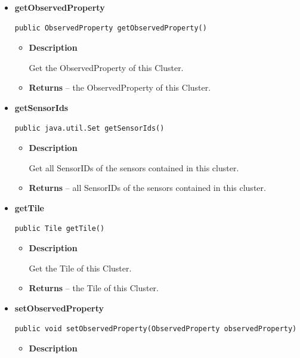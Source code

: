 {{{{\begin{itemize}
{\begin{itemize}
{Get the ClusterID of this Cluster.
}
\item{{\bf  Returns} -- 
the ClusterID of this Cluster. 
}%
\end{itemize}
}%
\item{ 
\hypertarget{Grid.Cluster.getObservedProperty()}{{\bf  getObservedProperty}\\}
\begin{lstlisting}[frame=none]
public ObservedProperty getObservedProperty()\end{lstlisting} %
\begin{itemize}
\item{
{\bf  Description}

Get the ObservedProperty of this Cluster.
}
\item{{\bf  Returns} -- 
the ObservedProperty of this Cluster. 
}%
\end{itemize}
}%
\item{ 
\hypertarget{Grid.Cluster.getSensorIds()}{{\bf  getSensorIds}\\}
\begin{lstlisting}[frame=none]
public java.util.Set getSensorIds()\end{lstlisting} %
\begin{itemize}
\item{
{\bf  Description}

Get all SensorIDs of the sensors contained in this cluster.
}
\item{{\bf  Returns} -- 
all SensorIDs of the sensors contained in this cluster. 
}%
\end{itemize}
}%
\item{ 
\hypertarget{Grid.Cluster.getTile()}{{\bf  getTile}\\}
\begin{lstlisting}[frame=none]
public Tile getTile()\end{lstlisting} %
\begin{itemize}
\item{
{\bf  Description}

Get the Tile of this Cluster.
}
\item{{\bf  Returns} -- 
the Tile of this Cluster. 
}%
\end{itemize}
}%
\item{ 
\hypertarget{Grid.Cluster.setObservedProperty(ObservedProperty)}{{\bf  setObservedProperty}\\}
\begin{lstlisting}[frame=none]
public void setObservedProperty(ObservedProperty observedProperty)\end{lstlisting} %
\begin{itemize}
\item{
{\bf  Description}

}
\end{itemize}}
\end{itemize}}}}}
